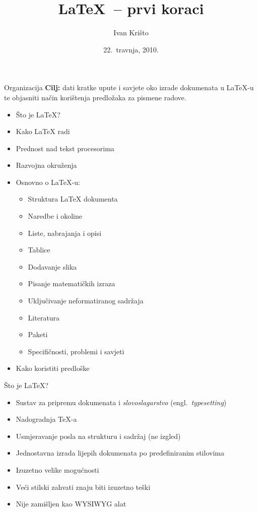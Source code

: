 \documentclass{beamer}
\title{\LaTeX\ -- prvi koraci}
\author{Ivan Krišto}
\institute{Fakultet elektrotehnike i računarstva, Zagreb}
\date{22.~travnja, 2010.}
\begin{document}
\begin{frame}[t,plain]
\titlepage
\end{frame}

\begin{frame}[t]{Organizacija}
\textbf{Cilj:} dati kratke upute i savjete oko izrade dokumenata u \LaTeX-u te
objasniti način korištenja predložaka za pismene radove.

\pause
\begin{multicols}{2}
\begin{itemize}
  \item Što je \LaTeX{}?
  \item Kako \LaTeX{} radi
  \item Prednost nad tekst procesorima
  \item Razvojna okruženja
\pause
  \item Osnovno o \LaTeX-u:
  \begin{itemize}
    \item Struktura \LaTeX{} dokumenta
    \item Naredbe i okoline
    \item Liste, nabrajanja i opisi
    \item Tablice
    \item Dodavanje slika
    \item Pisanje matematičkih izraza
    \item Uključivanje neformatiranog sadržaja 
    \item Literatura
    \item Paketi
    \item Specifičnosti, problemi i savjeti
  \end{itemize}
\pause
  \item Kako koristiti predloške
\end{itemize}
\end{multicols}
\end{frame}

\begin{frame}[t]{Što je \LaTeX{}?}
\begin{itemize}
  \item Sustav za pripremu dokumenata i \emph{slovoslagarstvo} (engl.\ \emph{typesetting})
  \item Nadogradnja \TeX-a
  \item Usmjeravanje posla na strukturu i sadržaj (ne izgled)
  \item Jednostavna izrada lijepih dokumenata po predefiniranim stilovima
  \item Izuzetno velike mogućnosti
  \item Veći stilski zahvati znaju biti izuzetno teški
  \item Nije zamišljen kao WYSIWYG alat
\end{itemize}
\end{frame}
\end{document}
